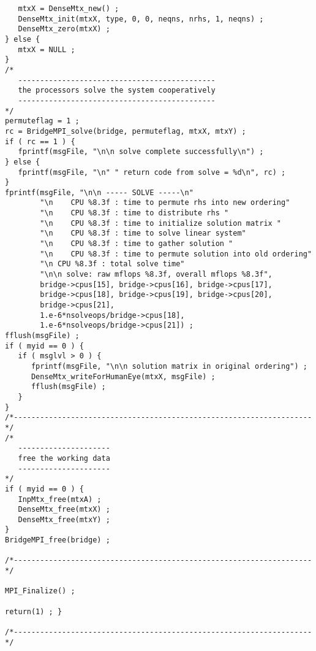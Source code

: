 \begin{verbatim}
   mtxX = DenseMtx_new() ;
   DenseMtx_init(mtxX, type, 0, 0, neqns, nrhs, 1, neqns) ;
   DenseMtx_zero(mtxX) ;
} else {
   mtxX = NULL ;
}
/*
   ---------------------------------------------
   the processors solve the system cooperatively
   ---------------------------------------------
*/
permuteflag = 1 ;
rc = BridgeMPI_solve(bridge, permuteflag, mtxX, mtxY) ;
if ( rc == 1 ) {
   fprintf(msgFile, "\n\n solve complete successfully\n") ;
} else {
   fprintf(msgFile, "\n" " return code from solve = %d\n", rc) ;
}
fprintf(msgFile, "\n\n ----- SOLVE -----\n"
        "\n    CPU %8.3f : time to permute rhs into new ordering"
        "\n    CPU %8.3f : time to distribute rhs "
        "\n    CPU %8.3f : time to initialize solution matrix "
        "\n    CPU %8.3f : time to solve linear system"
        "\n    CPU %8.3f : time to gather solution "
        "\n    CPU %8.3f : time to permute solution into old ordering"
        "\n CPU %8.3f : total solve time"
        "\n\n solve: raw mflops %8.3f, overall mflops %8.3f",
        bridge->cpus[15], bridge->cpus[16], bridge->cpus[17], 
        bridge->cpus[18], bridge->cpus[19], bridge->cpus[20],
        bridge->cpus[21],
        1.e-6*nsolveops/bridge->cpus[18],
        1.e-6*nsolveops/bridge->cpus[21]) ;
fflush(msgFile) ;
if ( myid == 0 ) {
   if ( msglvl > 0 ) {
      fprintf(msgFile, "\n\n solution matrix in original ordering") ;
      DenseMtx_writeForHumanEye(mtxX, msgFile) ;
      fflush(msgFile) ;
   }
}
/*--------------------------------------------------------------------*/
/*
   ---------------------
   free the working data
   ---------------------
*/
if ( myid == 0 ) {
   InpMtx_free(mtxA) ;
   DenseMtx_free(mtxX) ;
   DenseMtx_free(mtxY) ;
}
BridgeMPI_free(bridge) ;

/*--------------------------------------------------------------------*/

MPI_Finalize() ;

return(1) ; }

/*--------------------------------------------------------------------*/
\end{verbatim}
